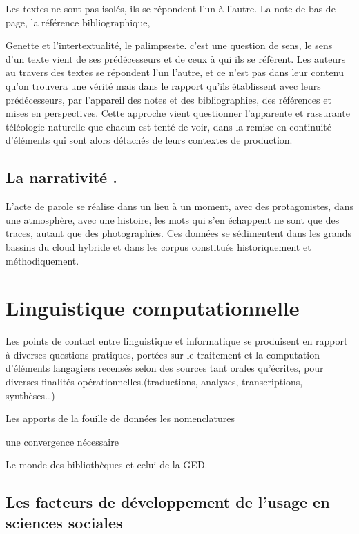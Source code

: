 \documentclass[
  letterpaper,
  DIV=11,
  numbers=noendperiod]{scrreprt}
\begin{document}
Les textes ne sont pas isolés, ils se répondent l'un à l'autre. La note
de bas de page, la référence bibliographique,

Genette et l'intertextualité, le palimpseste. c'est une question de
sens, le sens d'un texte vient de ses prédécesseurs et de ceux à qui ils
se réfèrent. Les auteurs au travers des textes se répondent l'un
l'autre, et ce n'est pas dans leur contenu qu'on trouvera une vérité
mais dans le rapport qu'ils établissent avec leurs prédécesseurs, par
l'appareil des notes et des bibliographies, des références et mises en
perspectives. Cette approche vient questionner l'apparente et rassurante
téléologie naturelle que chacun est tenté de voir, dans la remise en
continuité d'éléments qui sont alors détachés de leurs contextes de
production.

\subsection{La narrativité .}\label{la-narrativituxe9-.}

L'acte de parole se réalise dans un lieu à un moment, avec des
protagonistes, dans une atmosphère, avec une histoire, les mots qui s'en
échappent ne sont que des traces, autant que des photographies. Ces
données se sédimentent dans les grands bassins du cloud hybride et dans
les corpus constitués historiquement et méthodiquement.

\section{Linguistique
computationnelle}\label{linguistique-computationnelle}

Les points de contact entre linguistique et informatique se produisent
en rapport à diverses questions pratiques, portées sur le traitement et
la computation d'éléments langagiers recensés selon des sources tant
orales qu'écrites, pour diverses finalités opérationnelles.(traductions,
analyses, transcriptions, synthèses\ldots)

Les apports de la fouille de données les nomenclatures

une convergence nécessaire

Le monde des bibliothèques et celui de la GED.

\subsection{Les facteurs de développement de l'usage en sciences
sociales}\label{les-facteurs-de-duxe9veloppement-de-lusage-en-sciences-sociales}
\end{document}
